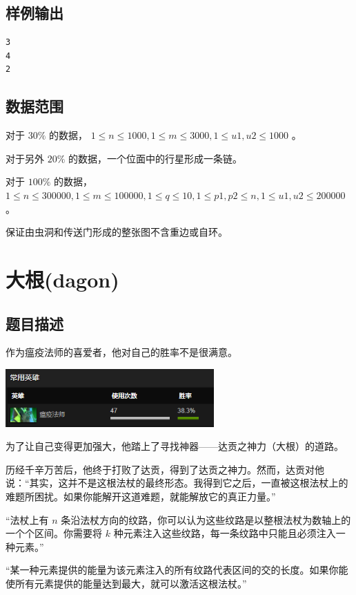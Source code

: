 \documentclass[12pt]{article}
\begin{document}
\subsection{样例输出}

\begin{verbatim}
3
4
2
\end{verbatim}

\subsection{数据范围}

对于 $30\%$ 的数据， $1\le n\le 1000,1\le m\le 3000,1\le u1,u2\le 1000$ 。

对于另外 $20\%$ 的数据，一个位面中的行星形成一条链。

对于 $100\%$ 的数据， $1\le n\le 300000,1\le m\le 100000,1\le q\le 10,1\le p1,p2\le n,1\le u1,u2\le 200000$ 。

保证由虫洞和传送门形成的整张图不含重边或自环。

\newpage
\section{大根(dagon)}
\subsection{题目描述}

作为瘟疫法师的喜爱者，他对自己的胜率不是很满意。

\includegraphics[width=0.6\textwidth]{nec.png}

为了让自己变得更加强大，他踏上了寻找神器——达贡之神力（大根）的道路。

历经千辛万苦后，他终于打败了达贡，得到了达贡之神力。然而，达贡对他说：“其实，这并不是这根法杖的最终形态。我得到它之后，一直被这根法杖上的难题所困扰。如果你能解开这道难题，就能解放它的真正力量。”

“法杖上有 $n$ 条沿法杖方向的纹路，你可以认为这些纹路是以整根法杖为数轴上的一个个区间。你需要将 $k$ 种元素注入这些纹路，每一条纹路中只能且必须注入一种元素。”

“某一种元素提供的能量为该元素注入的所有纹路代表区间的交的长度。如果你能使所有元素提供的能量达到最大，就可以激活这根法杖。”
\end{document}
